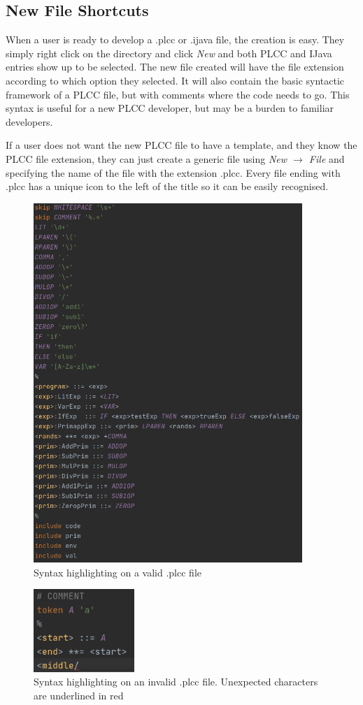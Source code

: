 \documentclass[conference, letterpaper]{IEEEtran}
\begin{document}
\subsection{New File Shortcuts}\label{subsec:new-plcc-file-shortcut}
When a user is ready to develop a .plcc or .ijava file, the creation is easy.
They simply right click on the directory and click \textit{New} and both PLCC and IJava entries show up to be selected.
The new file created will have the file extension according to which option they selected.
It will also contain the basic syntactic framework of a PLCC file, but with comments where the code needs to go.
This syntax is useful for a new PLCC developer, but may be a burden to familiar developers.

If a user does not want the new PLCC file to have a template, and they know the PLCC file extension, they can just create a generic file using \textit{New $\rightarrow$ File} and specifying the name of the file with the extension .plcc.
Every file ending with .plcc has a unique icon to the left of the title so it can be easily recognised.


\begin{figure}[!t]
    \centering
    \includegraphics[width=4in]{syntax.png}
    \caption{Syntax highlighting on a valid .plcc file}
    \label{fig:syntax}
\end{figure}
\begin{figure}[!t]
    \centering
    \includegraphics[width=1.5in]{syntax_invalid.png}
    \caption{Syntax highlighting on an invalid  .plcc file. Unexpected characters are underlined in red}
    \label{fig:syntax_invalid}
\end{figure}
\end{document}
